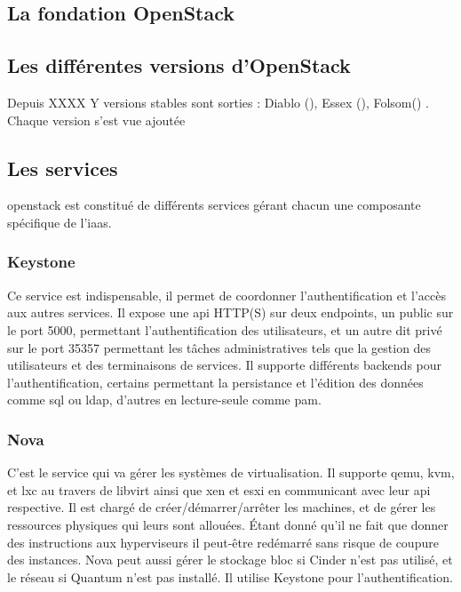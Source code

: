 \documentclass[a4paper,oneside]{report}
\begin{document}
\subsection{La fondation OpenStack} \label{sec:fondationos}

\subsection{Les différentes versions d'OpenStack}
Depuis XXXX Y versions stables sont sorties : Diablo (), Essex (), Folsom() . Chaque version s'est vue ajoutée

\subsection{Les services}
\gls{openstack} est constitué de différents services gérant chacun une composante spécifique de l'\gls{iaas}.
\subsubsection{Keystone}
Ce service est indispensable, il permet de coordonner l'authentification et l'accès aux autres services.\newline
Il expose une \gls{api} HTTP(S) sur deux endpoints, un public sur le port 5000, permettant l'authentification des utilisateurs, et un autre dit privé sur le port 35357 permettant les tâches administratives tels que la gestion des utilisateurs et des terminaisons de services.
Il supporte différents backends pour l'authentification, certains permettant la persistance et l'édition des données comme \gls{sql} ou \gls{ldap}, d'autres en lecture-seule comme \gls{pam}.\newline

\subsubsection{Nova}
C'est le service qui va gérer les systèmes de \gls{virtualisation}. Il supporte \gls{qemu}, \gls{kvm}, et \gls{lxc} au travers de libvirt ainsi que \gls{xen} et \gls{esxi} en communicant avec leur \gls{api} respective.
Il est chargé de créer/démarrer/arrêter les machines, et de gérer les ressources physiques qui leurs sont allouées. Étant donné qu'il ne fait que donner des instructions aux hyperviseurs il peut-être redémarré sans risque de coupure des instances.\newline
Nova peut aussi gérer le stockage bloc si Cinder n'est pas utilisé, et le réseau si Quantum n'est pas installé.\newline
Il utilise Keystone pour l'authentification.
\end{document}
